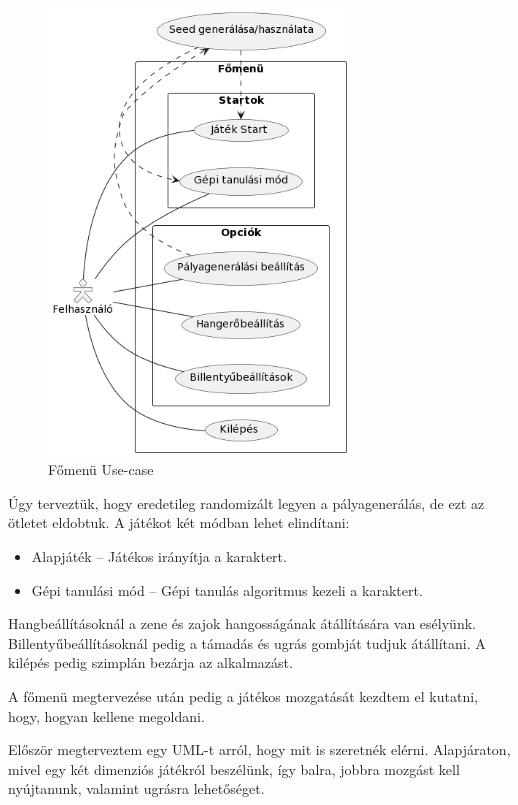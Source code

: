 \documentclass[]{thesis-ekf}
\theoremstyle{definition}
\begin{document}
	\begin{figure}[!ht]
		\label{kep:mainmenuusecase}
		\centering
		\includegraphics[width=8cm]{MainMenu_usecase}
		\caption{Főmenü Use-case}
	\end{figure}

	Úgy terveztük, hogy eredetileg randomizált legyen a pályagenerálás, de ezt az ötletet eldobtuk. A játékot két módban lehet elindítani:
	
	\begin{itemize}
		\item Alapjáték -- Játékos irányítja a karaktert.
		\item Gépi tanulási mód -- Gépi tanulás algoritmus kezeli a karaktert.
	\end{itemize}

	Hangbeállításoknál a zene és zajok hangosságának átállítására van esélyünk. Billentyűbeállításoknál pedig a támadás és ugrás gombját tudjuk átállítani. A kilépés pedig szimplán bezárja az alkalmazást.
	
	A főmenü megtervezése után pedig a játékos mozgatását kezdtem el kutatni, hogy, hogyan kellene megoldani.
	
	Először megterveztem egy UML-t arról, hogy mit is szeretnék elérni.
	Alapjáraton, mivel egy két dimenziós játékról beszélünk, így balra, jobbra mozgást kell nyújtanunk, valamint ugrásra lehetőséget.
	
\end{document}
